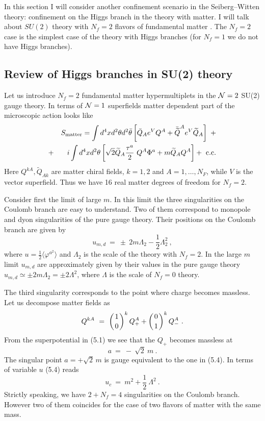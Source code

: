 \documentclass[a4paper,12pt]{article}
\begin{document}
In this section I will consider another confinement scenario in
the Seiberg--Witten theory: confinement on the Higgs branch in
the theory with matter. I will  talk about $SU(2)$ theory
with $N_f=2$ flavors of fundamental matter \cite{SW2}. The
$N_f=2$ case is the simplest case of the theory with Higgs
branches  (for $N_f=1$ we do not have Higgs branches).

\subsection{Review of Higgs branches in SU(2) theory}

Let us introduce $N_f=2$ fundamental matter hypermultiplets in
the ${\cal N}=2$ SU(2) gauge theory. In terms of ${\cal N}=1$ superfields
matter dependent part of the microscopic action looks like
\begin{eqnarray}
&& S_{\rm matter}=\int d^4xd^2\theta d^2\bar\theta\left[\bar Q_A
e^VQ^A+\bar{\widetilde  Q}^Ae^V\widetilde Q_A\right]\ + \nonumber\\
+&& i\int d^4xd^2\theta\left[\sqrt2\widetilde Q_A\frac{\tau^a}2\
Q^A\Phi^a+m\widetilde Q_AQ^A\right]+\mbox{ c.c.}
\end{eqnarray}
Here $Q^{kA},\widetilde Q_{Ak}$ are matter chiral fields, $k=1,2$ and
$A=1,\ldots,N_F$, while $V$ is the vector superfield.
Thus we have 16 real matter degrees of freedom for $N_f=2$.

Consider first the limit of large $m$. In this limit the  three
singularities on the Coulomb branch are easy to understand. Two
of them correspond to monopole and dyon singularities of the
pure gauge theory. Their positions on the Coulomb branch are
given by \cite{SW2}
\begin{equation}
u_{m,d}\ =\ \pm\ 2m\Lambda_2-\frac12\Lambda^2_2\ ,
\end{equation}
where $u=\frac12\langle\varphi^{a^2}\rangle$ and $\Lambda_2$ is
the scale of the theory with $N_f=2$.
In the large $m$ limit $u_{m,d}$ are
approximately given by their values in the pure gauge theory
$u_{m,d}\simeq\pm2m\Lambda_2=\pm2\Lambda^2$, where $\Lambda$
is the scale of $N_f=0$ theory.

The third singularity corresponds to the point where charge
becomes massless. Let us decompose matter fields as
\begin{equation}
Q^{kA}\ =\ \left({1\atop 0}\right)^k Q^A_++\left({0\atop 1}
\right)^kQ^A_-\ .
\end{equation}
From the superpotential in (5.1) we see that the $Q_+$ becomes
massless at
\begin{equation}
a\ =\ -\ \sqrt2\ m\ .
\end{equation}
The singular point $a=+\sqrt2\,m$ is gauge equivalent to the one
in (5.4). In terms of variable $u$ (5.4) reads
\begin{equation}
u_c\ =\ m^2+\frac12\ \Lambda^2\ .
\end{equation}
Strictly speaking, we have $2+N_f=4$ singularities on the
Coulomb branch. However two of them  coincides for the case of
two flavors of matter with the same mass.
\end{document}
